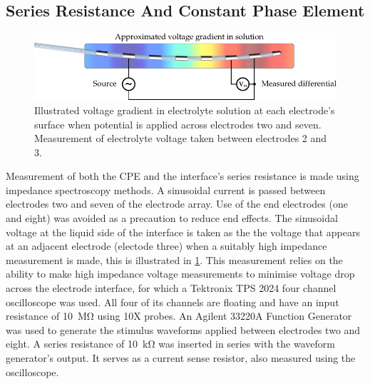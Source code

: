     \subsection{Series Resistance And Constant Phase Element}
      \begin{figure}
        \centering
        \includegraphics{content/pt2/08-InterfaceParameters/graphics/measurement_CPE}
        \caption{\label{fig:pt2-measurement_CPE}Illustrated voltage gradient in electrolyte solution at each electrode's surface when potential is applied across electrodes two and seven. Measurement of electrolyte voltage taken between electrodes 2 and 3.}
      \end{figure}
      Measurement of both the CPE and the interface's series resistance is made using impedance spectroscopy methods.
      A sinusoidal current is passed between electrodes two and seven of the electrode array.
      Use of the end electrodes (one and eight) was avoided as a precaution to reduce end effects.
      The sinusoidal voltage at the liquid side of the interface is taken as the the voltage that appears at an adjacent electrode (electode three) when a suitably high impedance measurement is made, this is illustrated in \cref{fig:pt2-measurement_CPE}.
      This measurement relies on the ability to make high impedance voltage measurements to minimise voltage drop across the electrode interface, for which a Tektronix TPS 2024 four channel oscilloscope was used.
      All four of its channels are floating and have an input resistance of \SI{10}{\mega\ohm} using 10X probes.
      An Agilent 33220A Function Generator was used to generate the stimulus waveforms applied between electrodes two and eight.
      A series resistance of \SI{10}{\kilo\ohm} was inserted in series with the waveform generator's output.
      It serves as a current sense resistor, also measured using the oscilloscope.
